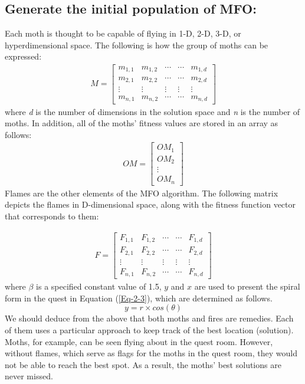 \documentclass[12pt]{Definitions/academia}
\begin{document}
\subsection*{Generate the initial population of MFO:}
Each moth is thought to be capable of flying in 1-D, 2-D, 3-D, or hyperdimensional space. The following is how the group of moths can be expressed:
  \begin{eqnarray}
M=\begin{bmatrix}
m_{1,1} & m_{1,2} & \cdots  & \cdots &  m_{1,d}\\
m_{2,1} & m_{2,2} & \cdots  & \cdots &  m_{2,d} \\
\vdots  & \vdots  & \vdots & \vdots & \vdots \\
m_{n,1} & m_{n,2} & \cdots  & \cdots &  m_{n,d}
\end{bmatrix}
\end{eqnarray}
where \emph{d} is the number of dimensions in the solution space and \emph{n} is the number of moths. In addition, all of the moths' fitness values are stored in an array as follows:
\begin{eqnarray}
OM=\begin{bmatrix}
OM_{1}\\
OM_{2}\\
\vdots \\
OM_{n}
\end{bmatrix}
\end{eqnarray}
Flames are the other elements of the MFO algorithm. The following matrix depicts the flames in D-dimensional space, along with the fitness function vector that corresponds to them:

\begin{eqnarray}
F=\begin{bmatrix}
F_{1,1} & F_{1,2} & \cdots  & \cdots &  F_{1,d}\\
F_{2,1} & F_{2,2} & \cdots  & \cdots &  F_{2,d} \\
\vdots  & \vdots  & \vdots & \vdots & \vdots \\
F_{n,1} & F_{n,2} & \cdots  & \cdots &  F_{n,d}
\end{bmatrix}
\end{eqnarray}
where $\beta$ is a specified constant value of 1.5, $ y$ and $x$ are used to present the spiral form in the quest in Equation (\ref{Eq-2-3}), which are determined as follows.
\begin{equation}\label{Eq-2-3}
y=r \times cos(\theta)
\end{equation}
We should deduce from the above that both moths and fires are remedies. Each of them uses a particular approach to keep track of the best location (solution). Moths, for example, can be seen flying about in the quest room. However, without flames, which serve as flags for the moths in the quest room, they would not be able to reach the best spot. As a result, the moths' best solutions are never missed.
\end{document}
